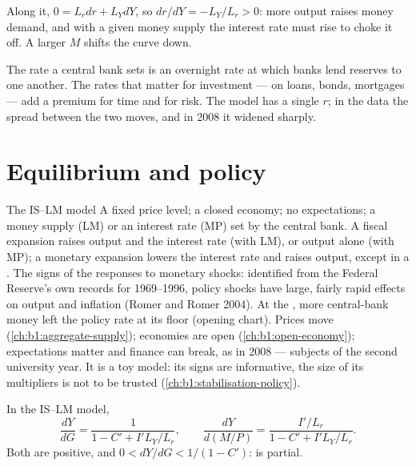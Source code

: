 Along it, $0 = L_r dr + L_Y dY$, so $dr/dY = -L_Y/L_r > 0$: more output raises money
demand, and with a given money supply the interest rate must rise to
choke it off. A larger $M$ shifts the curve down.

\begin{measure}
The rate a central bank sets is an overnight rate at which banks lend
reserves to one another. The rates that matter for investment --- on loans,
bonds, mortgages --- add a premium for time and for risk. The model has a
single $r$; in the data the spread between the two moves, and in 2008 it
widened sharply.
\end{measure}

\section{Equilibrium and policy}\label{sec:b1:is-lm:equilibrium}

\begin{model}{The IS--LM model}
\assumes A fixed price level; a closed economy; no expectations; a money
supply (LM) or an interest rate (MP) set by the central bank.
\predicts A fiscal expansion raises output and the interest rate (with
LM), or output alone (with MP); a monetary expansion lowers the interest
rate and raises output, except in a .
\tested The signs of the responses to monetary shocks: identified from the
Federal Reserve's own records for 1969--1996, policy shocks have large,
fairly rapid effects on output and inflation (Romer and Romer 2004).
At the , more central-bank money left the policy rate at
its floor (opening chart).
\breaks Prices move (\cref{ch:b1:aggregate-supply}); economies are open
(\cref{ch:b1:open-economy}); expectations matter and finance can break, as
in 2008 --- subjects of the second university year. It is a toy model: its
signs are informative, the size of its multipliers is not to be trusted
(\cref{ch:b1:stabilisation-policy}).
\end{model}

\begin{proposition}\label{prop:b1:is-lm:multipliers}
In the IS--LM model,
\[
\frac{dY}{dG} = \frac{1}{1 - C' + I'L_Y/L_r}, \qquad
\frac{dY}{d(M/P)} = \frac{I'/L_r}{1 - C' + I'L_Y/L_r}.
\]
Both are positive, and $0 < dY/dG < 1/(1 - C')$:  is partial.
\end{proposition}

